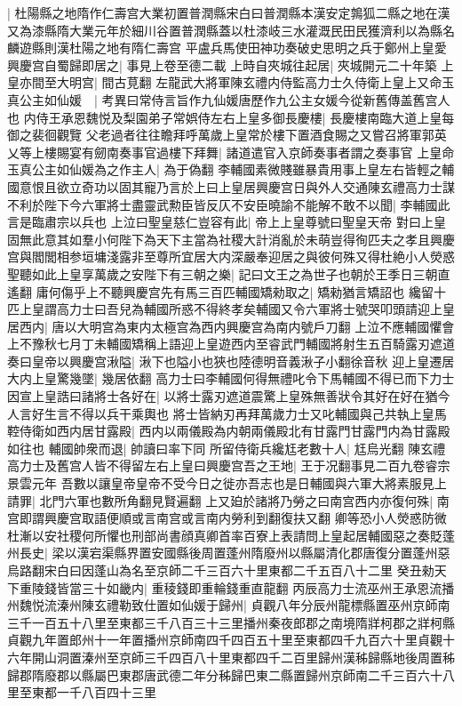 |{
	杜陽縣之地隋作仁壽宫大業初置普潤縣宋白曰普潤縣本漢安定鶉狐二縣之地在漢又為漆縣隋大業元年於細川谷置普潤縣蓋以杜漆岐三水灌溉民田民獲濟利以為縣名麟遊縣則漢杜陽之地有隋仁壽宫}
平盧兵馬使田神功奏破史思明之兵于鄭州上皇愛興慶宫自蜀歸即居之|{
	事見上卷至德二載}
上時自夾城往起居|{
	夾城開元二十年築}
上皇亦間至大明宫|{
	間古莧翻}
左龍武大將軍陳玄禮内侍監高力士久侍衛上皇上又命玉真公主如仙媛　|{
	考異曰常侍言旨作九仙媛唐歷作九公主女媛今從新舊傳盖舊宫人也}
内侍王承恩魏悦及梨園弟子常娯侍左右上皇多御長慶樓|{
	長慶樓南臨大道上皇每御之裴徊觀覽}
父老過者往往瞻拜呼萬歲上皇常於樓下置酒食賜之又嘗召將軍郭英乂等上樓賜宴有劒南奏事官過樓下拜舞|{
	諸道遣官入京師奏事者謂之奏事官}
上皇命玉真公主如仙媛為之作主人|{
	為于偽翻}
李輔國素微賤雖暴貴用事上皇左右皆輕之輔國意恨且欲立奇功以固其寵乃言於上曰上皇居興慶宫日與外人交通陳玄禮高力士謀不利於陛下今六軍將士盡靈武勲臣皆反仄不安臣曉諭不能解不敢不以聞|{
	李輔國此言是臨肅宗以兵也}
上泣曰聖皇慈仁豈容有此|{
	帝上上皇尊號曰聖皇天帝}
對曰上皇固無此意其如羣小何陛下為天下主當為社稷大計消亂於未萌豈得徇匹夫之孝且興慶宫與閻閭相参垣墉淺露非至尊所宜居大内深嚴奉迎居之與彼何殊又得杜絶小人熒惑聖聽如此上皇享萬歲之安陛下有三朝之樂|{
	記曰文王之為世子也朝於王季日三朝直遙翻}
庸何傷乎上不聽興慶宫先有馬三百匹輔國矯勑取之|{
	矯勑猶言矯詔也}
纔留十匹上皇謂高力士曰吾兒為輔國所惑不得終孝矣輔國又令六軍將士號哭叩頭請迎上皇居西内|{
	唐以大明宫為東内太極宫為西内興慶宫為南内號戶刀翻}
上泣不應輔國懼會上不豫秋七月丁未輔國矯稱上語迎上皇遊西内至睿武門輔國將射生五百騎露刃遮道奏曰皇帝以興慶宫湫隘|{
	湫下也隘小也狹也陸德明音義湫子小翻徐音秋}
迎上皇遷居大内上皇驚幾墜|{
	幾居依翻}
高力士曰李輔國何得無禮叱令下馬輔國不得已而下力士因宣上皇誥曰諸將士各好在|{
	以將士露刃遮道震驚上皇殊無善狀令其好在好在猶今人言好生言不得以兵干乘輿也}
將士皆納刃再拜萬歲力士又叱輔國與己共執上皇馬鞚侍衛如西内居甘露殿|{
	西内以兩儀殿為内朝兩儀殿北有甘露門甘露門内為甘露殿如往也}
輔國帥衆而退|{
	帥讀曰率下同}
所留侍衛兵纔尪老數十人|{
	尪烏光翻}
陳玄禮高力士及舊宫人皆不得留左右上皇曰興慶宫吾之王地|{
	王于况翻事見二百九卷睿宗景雲元年}
吾數以讓皇帝皇帝不受今日之徙亦吾志也是日輔國與六軍大將素服見上請罪|{
	北門六軍也數所角翻見賢遍翻}
上又廹於諸將乃勞之曰南宫西内亦復何殊|{
	南宫即謂興慶宫取語便順或言南宫或言南内勞利到翻復扶又翻}
卿等恐小人熒惑防微杜漸以安社稷何所懼也刑部尚書顔真卿首率百寮上表請問上皇起居輔國惡之奏貶蓬州長史|{
	梁以漢宕渠縣界置安國縣後周置蓬州隋廢州以縣屬清化郡唐復分置蓬州惡烏路翻宋白曰因蓬山為名至京師二千三百六十里東都二千五百八十二里}
癸丑勑天下重陵錢皆當三十如畿内|{
	重稜錢即重輪錢重直龍翻}
丙辰高力士流巫州王承恩流播州魏悦流溱州陳玄禮勒致仕置如仙媛于歸州|{
	貞觀八年分辰州龍標縣置巫州京師南三千一百五十八里至東都三千八百三十三里播州秦夜郎郡之南境隋牂柯郡之牂柯縣貞觀九年置郎州十一年置播州京師南四千四百五十里至東都四千九百六十里貞觀十六年開山洞置溱州至京師三千四百八十里東都四千二百里歸州漢秭歸縣地後周置秭歸郡隋廢郡以縣屬巴東郡唐武德二年分秭歸巴東二縣置歸州京師南二千三百六十八里至東都一千八百四十三里}
